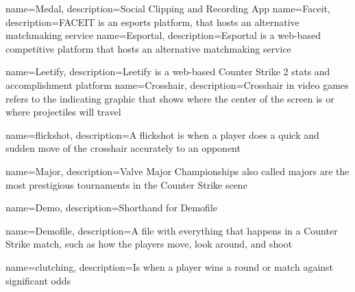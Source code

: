 {
    name=Medal,
    description={Social Clipping and Recording App}
}
{
    name=Faceit,
    description={FACEIT is an esports platform, that hosts an alternative matchmaking service}
}
{
    name=Esportal,
    description={Esportal is a web-based competitive platform that hosts an alternative matchmaking service }
}


{
    name=Leetify,
    description={Leetify is a web-based Counter Strike 2 stats and accomplishment platform}
}
{
    name=Crosshair,
    description={Crosshair in video games refers to the indicating graphic that shows where the center of the screen is or where projectiles will travel}
}

{
    name=flickshot,
    description={A flickshot is when a player does a quick and sudden move of the crosshair accurately to an opponent}
}

{
    name=Major,
    description={Valve Major Championships also called majors are the most prestigious tournaments in the Counter Strike scene}
}

{
    name=Demo,
    description={Shorthand for \Gls{Demofile}}
}

{
    name=Demofile,
    description={A file with everything that happens in a Counter Strike match, such as how the players move, look around, and shoot}
}


{
    name=clutching,
    description={Is when a player wins a round or match against significant odds}
}

